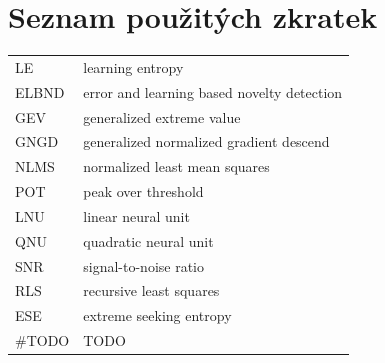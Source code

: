 
\cleardoublepage
\thispagestyle{empty}

\chapter*{Seznam použitých zkratek}
\begin{tabular}{ll}
LE                      & learning entropy                                  \\
ELBND                   & error and learning based novelty detection        \\
GEV                     & generalized extreme value                         \\
GNGD                    & generalized normalized gradient descend           \\
NLMS                    & normalized least mean squares                     \\
POT                     & peak over threshold                               \\
LNU                     & linear neural unit                                \\
QNU                     & quadratic neural unit                             \\
SNR                     & signal-to-noise ratio                             \\
RLS                     & recursive least squares                           \\
ESE                     & extreme seeking entropy                           \\
\#TODO                  & TODO
\end{tabular}

\cleardoublepage
\thispagestyle{empty}

